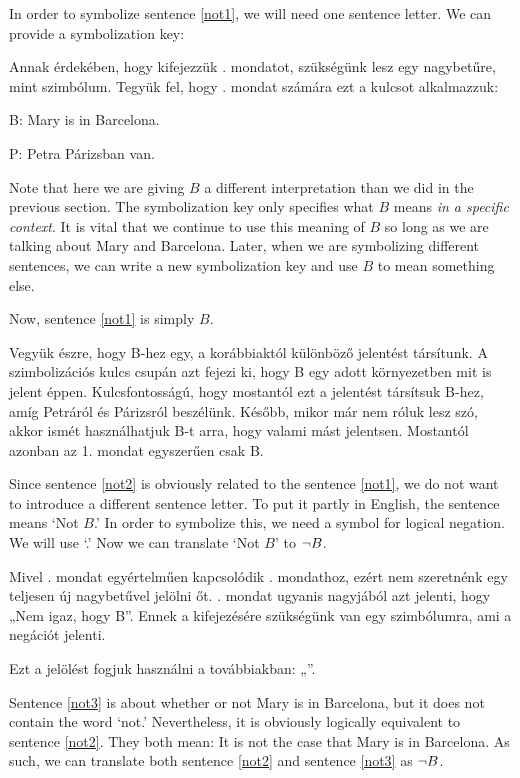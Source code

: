 In order to symbolize sentence \ref{not1}, we will need one sentence letter. We can provide a symbolization key:

Annak érdekében, hogy kifejezzük . mondatot, szükségünk lesz egy nagybetűre, mint szimbólum.
Tegyük fel, hogy . mondat számára ezt a kulcsot alkalmazzuk:
\begin{ekey}
\item[B:]Mary is in Barcelona.
\end{ekey}

\begin{ekey}
\item[P:]Petra Párizsban van.
\end{ekey}

Note that here we are giving $B$ a different interpretation than we did in the previous section. The symbolization key only specifies what $B$ means \emph{in a specific context}. It is vital that we continue to use this meaning of $B$ so long as we are talking about Mary and Barcelona. Later, when we are symbolizing different sentences, we can write a new symbolization key and use $B$ to mean something else.

Now, sentence \ref{not1} is simply $B$. 

Vegyük észre, hogy B-hez egy, a korábbiaktól különböző jelentést társítunk. A szimbolizációs kulcs csupán azt fejezi ki, hogy B egy adott környezetben mit is jelent éppen.
Kulcsfontosságú, hogy mostantól ezt a jelentést társítsuk B-hez, amíg Petráról és Párizsról beszélünk. Később, mikor már nem róluk lesz szó, akkor ismét használhatjuk B-t arra, hogy valami mást jelentsen. Mostantól azonban az 1. mondat egyszerűen csak B.

Since sentence \ref{not2} is obviously related to the sentence \ref{not1}, we do not want to introduce a different sentence letter. To put it partly in English, the sentence means `Not $B$.' In order to symbolize this, we need a symbol for logical negation. We will use `\enot.' Now we can translate `Not $B$' to $\neg B$.

Mivel . mondat egyértelműen kapcsolódik . mondathoz, ezért nem szeretnénk egy teljesen új nagybetűvel jelölni őt.
. mondat ugyanis nagyjából azt jelenti, hogy „Nem igaz, hogy B”.
Ennek a kifejezésére szükségünk van egy szimbólumra, ami a negációt jelenti.

Ezt a jelölést fogjuk használni a továbbiakban: „\enot”.

Sentence \ref{not3} is about whether or not Mary is in Barcelona, but it does not contain the word `not.' Nevertheless, it is obviously logically equivalent to sentence \ref{not2}. They both mean: It is not the case that Mary is in Barcelona. As such, we can translate both sentence \ref{not2} and sentence \ref{not3} as $\neg B$.

